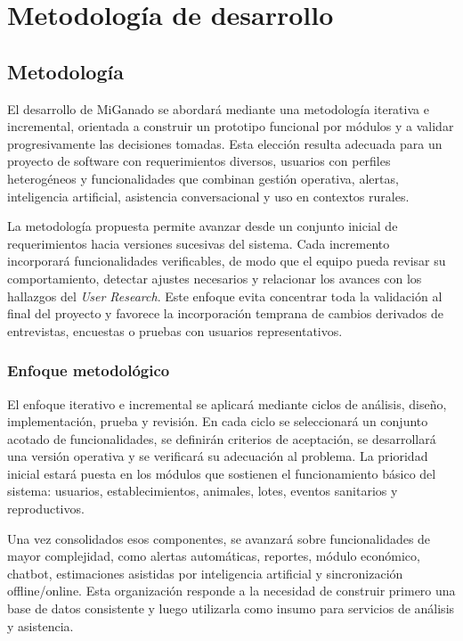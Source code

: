 \chapter{Metodolog\'ia de desarrollo}\label{chapter:metodologia}

\section{Metodolog\'ia}

El desarrollo de MiGanado se abordar\'a mediante una metodolog\'ia iterativa e incremental, orientada a construir un prototipo funcional por m\'odulos y a validar progresivamente las decisiones tomadas. Esta elecci\'on resulta adecuada para un proyecto de software con requerimientos diversos, usuarios con perfiles heterog\'eneos y funcionalidades que combinan gesti\'on operativa, alertas, inteligencia artificial, asistencia conversacional y uso en contextos rurales.

La metodolog\'ia propuesta permite avanzar desde un conjunto inicial de requerimientos hacia versiones sucesivas del sistema. Cada incremento incorporar\'a funcionalidades verificables, de modo que el equipo pueda revisar su comportamiento, detectar ajustes necesarios y relacionar los avances con los hallazgos del \emph{User Research}. Este enfoque evita concentrar toda la validaci\'on al final del proyecto y favorece la incorporaci\'on temprana de cambios derivados de entrevistas, encuestas o pruebas con usuarios representativos.

\subsection{Enfoque metodol\'ogico}

El enfoque iterativo e incremental se aplicar\'a mediante ciclos de an\'alisis, dise\~no, implementaci\'on, prueba y revisi\'on. En cada ciclo se seleccionar\'a un conjunto acotado de funcionalidades, se definir\'an criterios de aceptaci\'on, se desarrollar\'a una versi\'on operativa y se verificar\'a su adecuaci\'on al problema. La prioridad inicial estar\'a puesta en los m\'odulos que sostienen el funcionamiento b\'asico del sistema: usuarios, establecimientos, animales, lotes, eventos sanitarios y reproductivos.

Una vez consolidados esos componentes, se avanzar\'a sobre funcionalidades de mayor complejidad, como alertas autom\'aticas, reportes, m\'odulo econ\'omico, chatbot, estimaciones asistidas por inteligencia artificial y sincronizaci\'on offline/online. Esta organizaci\'on responde a la necesidad de construir primero una base de datos consistente y luego utilizarla como insumo para servicios de an\'alisis y asistencia.

